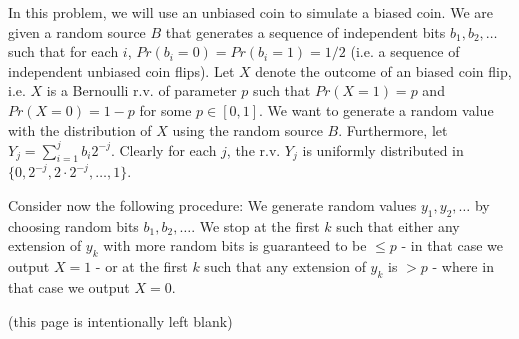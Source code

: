 In this problem, we will use an unbiased coin to simulate a biased coin. We are given a random source $B$ that generates a sequence of independent bits $b_1,b_2,\ldots$ such that for each $i$, $Pr(b_i=0)=Pr(b_i=1)=1/2$ (i.e. a sequence of independent unbiased coin flips). Let $X$ denote the outcome of an biased coin flip, i.e. $X$ is a Bernoulli r.v. of parameter $p$ such that $Pr(X=1)=p$ and $Pr(X=0)=1-p$ for some $p\in[0,1]$. We want to generate a random value with the distribution of $X$ using the random source $B$. Furthermore, let $Y_j=\sum_{i=1}^j b_i2^{-j}$. Clearly for each $j$, the r.v. $Y_j$ is uniformly distributed in $\{0,2^{-j},2\cdot 2^{-j},\ldots,1\}$.\par 
Consider now the following procedure: We generate random values $y_1,y_2,\ldots$ by choosing random bits $b_1,b_2,\ldots$. We stop at the first $k$ such that either any extension of $y_k$ with more random bits is guaranteed to be $\leq p$ - in that case we output $X=1$ - or at the first $k$ such that any extension of $y_k$ is $>p$ - where in that case we output $X=0$.
\newpage (this page is intentionally left blank)
\newpage

